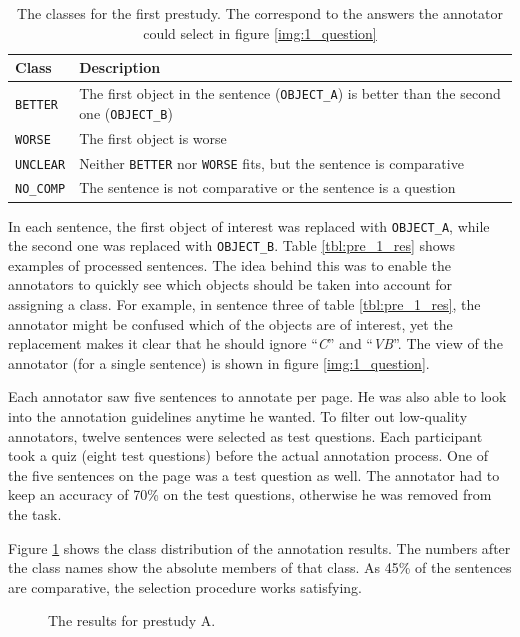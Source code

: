 \begin{table}[h]
\centering
\caption{The classes for the first prestudy. The correspond to the answers the annotator could select in figure \ref{img:1_question}}
\label{tbl:prestudyclasses-a}
\begin{tabular}{@{}ll@{}}
\toprule
Class & Description \\ \midrule
\texttt{BETTER} & The first object in the sentence (\texttt{OBJECT\_A}) is better than the second one (\texttt{OBJECT\_B})\\
\texttt{WORSE} & The first object is worse \\
\texttt{UNCLEAR} & Neither \texttt{BETTER} nor \texttt{WORSE} fits, but the sentence is comparative\\
\texttt{NO\_COMP} & The sentence is not comparative or the sentence is a question\\
\bottomrule
\end{tabular}
\end{table}

In each sentence, the first object of interest was replaced with \texttt{OBJECT\_A}, while the second one was replaced with \texttt{OBJECT\_B}. Table \ref{tbl:pre_1_res} shows examples of processed sentences. The idea behind this was to enable the annotators to quickly see which objects should be taken into account for assigning a class. For example, in sentence three of table \ref{tbl:pre_1_res}, the annotator might be confused which of the objects are of interest, yet the replacement makes it clear that he should ignore \enquote{\emph{C}} and \enquote{\emph{VB}}. The view of the annotator (for a single sentence) is shown in figure \ref{img:1_question}.

Each annotator saw five sentences to annotate per page. He was also able to look into the annotation guidelines anytime he wanted. To filter out low-quality annotators, twelve sentences were selected as test questions. Each participant took a quiz (eight test questions) before the actual annotation process. One of the five sentences on the page was a test question as well. The annotator had to keep an accuracy of 70\% on the test questions, otherwise he was removed from the task.

Figure \ref{fig:dist_pre_a} shows the class distribution of the annotation results. The numbers after the class names show the absolute members of that class. As 45\% of the sentences are comparative, the selection procedure works satisfying.

\begin{figure}[h]
\centering
\caption{The results for prestudy A.}
\label{fig:dist_pre_a}
\end{figure}


